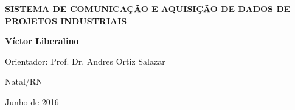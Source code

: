 \begin{titlepage}
\begin{center}
\vfill

\LARGE

\textbf{SISTEMA DE COMUNICAÇÃO E AQUISIÇÃO DE DADOS DE PROJETOS INDUSTRIAIS}

\vfill

\Large

\textbf{Víctor Liberalino}

\vfill
%
\normalsize

Orientador: Prof. Dr. Andres Ortiz Salazar

\vfill




\vfill

\large

Natal/RN

Junho de 2016

\end{center}

\end{titlepage}


